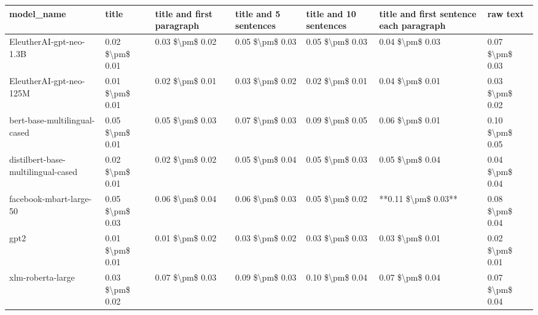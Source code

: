 \begin{tabular}{lllllll}
\toprule
                        model\_name &           title & title and first paragraph & title and 5 sentences & title and 10 sentences & title and first sentence each paragraph &        raw text \\
\midrule
           EleutherAI-gpt-neo-1.3B & 0.02 \$\textbackslash pm\$ 0.01 &           0.03 \$\textbackslash pm\$ 0.02 &       0.05 \$\textbackslash pm\$ 0.03 &        0.05 \$\textbackslash pm\$ 0.03 &                         0.04 \$\textbackslash pm\$ 0.03 & 0.07 \$\textbackslash pm\$ 0.03 \\
           EleutherAI-gpt-neo-125M & 0.01 \$\textbackslash pm\$ 0.01 &           0.02 \$\textbackslash pm\$ 0.01 &       0.03 \$\textbackslash pm\$ 0.02 &        0.02 \$\textbackslash pm\$ 0.01 &                         0.04 \$\textbackslash pm\$ 0.01 & 0.03 \$\textbackslash pm\$ 0.02 \\
      bert-base-multilingual-cased & 0.05 \$\textbackslash pm\$ 0.01 &           0.05 \$\textbackslash pm\$ 0.03 &       0.07 \$\textbackslash pm\$ 0.03 &        0.09 \$\textbackslash pm\$ 0.05 &                         0.06 \$\textbackslash pm\$ 0.01 & 0.10 \$\textbackslash pm\$ 0.05 \\
distilbert-base-multilingual-cased & 0.02 \$\textbackslash pm\$ 0.01 &           0.02 \$\textbackslash pm\$ 0.02 &       0.05 \$\textbackslash pm\$ 0.04 &        0.05 \$\textbackslash pm\$ 0.03 &                         0.05 \$\textbackslash pm\$ 0.04 & 0.04 \$\textbackslash pm\$ 0.04 \\
           facebook-mbart-large-50 & 0.05 \$\textbackslash pm\$ 0.03 &           0.06 \$\textbackslash pm\$ 0.04 &       0.06 \$\textbackslash pm\$ 0.03 &        0.05 \$\textbackslash pm\$ 0.02 &                     **0.11 \$\textbackslash pm\$ 0.03** & 0.08 \$\textbackslash pm\$ 0.04 \\
                              gpt2 & 0.01 \$\textbackslash pm\$ 0.01 &           0.01 \$\textbackslash pm\$ 0.02 &       0.03 \$\textbackslash pm\$ 0.02 &        0.03 \$\textbackslash pm\$ 0.03 &                         0.03 \$\textbackslash pm\$ 0.01 & 0.02 \$\textbackslash pm\$ 0.01 \\
                 xlm-roberta-large & 0.03 \$\textbackslash pm\$ 0.02 &           0.07 \$\textbackslash pm\$ 0.03 &       0.09 \$\textbackslash pm\$ 0.03 &        0.10 \$\textbackslash pm\$ 0.04 &                         0.07 \$\textbackslash pm\$ 0.04 & 0.07 \$\textbackslash pm\$ 0.04 \\
\bottomrule
\end{tabular}
